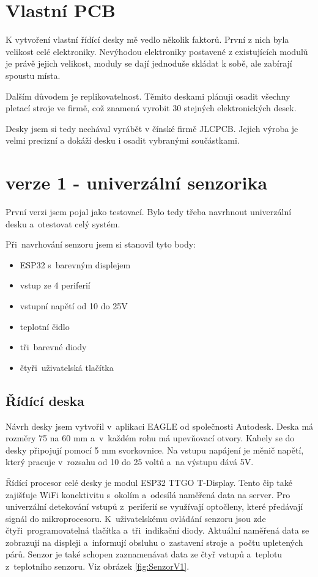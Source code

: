 \section{Vlastní PCB}
K vytvoření vlastní řídící desky mě vedlo několik faktorů. První z nich byla velikost celé elektroniky. 
Nevýhodou elektroniky postavené z existujících modulů je právě jejich velikost, moduly se dají jednoduše skládat k sobě, ale zabírají spoustu místa. 
 
Dalším důvodem je replikovatelnost. Těmito deskami plánuji osadit všechny pletací stroje ve firmě, což znamená vyrobit 30 stejných elektronických desek.

Desky jsem si tedy nechával vyrábět v čínské firmě JLCPCB. Jejich výroba je velmi precizní a dokáží desku i osadit vybranými součástkami.



\section{verze 1 - univerzální senzorika}

První verzi jsem pojal jako testovací. Bylo tedy třeba navrhnout univerzální desku a~otestovat celý systém.\newline

Při~navrhování senzoru jsem si stanovil tyto body:
\begin{itemize}
    \item ESP32 s~barevným displejem
    \item vstup ze 4 periferií
    \item vstupní napětí od 10 do 25V
    \item teplotní čidlo
    \item tři~barevné diody
    \item čtyři~uživatelská tlačítka
\end{itemize}


\subsection{Řídící deska}
Návrh desky jsem vytvořil v~aplikaci EAGLE od společnosti Autodesk. 
Deska má rozměry 75 na 60 mm a~v~každém rohu má upevňovací otvory.
Kabely se do desky připojují pomocí 5 mm svorkovnice.
Na vstupu napájení je měnič napětí, který pracuje v~rozsahu od 10 do 25 voltů a~na výstupu dává 5V. 

Řídící procesor celé desky je modul ESP32 TTGO T-Display.
Tento čip také zajišťuje WiFi konektivitu s~okolím a~odesílá naměřená data na server.
Pro univerzální detekování vstupů z~periferií se využívají optočleny, které předávají signál do mikroprocesoru.
K~uživatelskému ovládání senzoru jsou zde čtyři~programovatelná tlačítka a~tři~indikační diody.
Aktuální naměřená data se zobrazují na displeji a~informují obsluhu o~zastavení stroje a~počtu upletených párů.
Senzor je také schopen zaznamenávat data ze čtyř vstupů a~teplotu z~teplotního senzoru. Viz obrázek \ref{fig:SenzorV1}.

